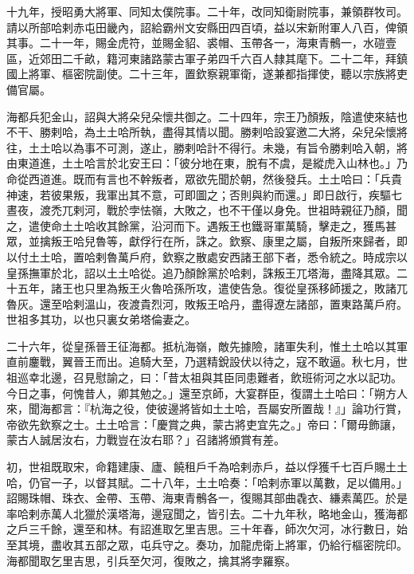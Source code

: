 \begin{pinyinscope}
 十九年，授昭勇大將軍、同知太僕院事。二十年，改同知衛尉院事，兼領群牧司。請以所部哈剌赤屯田畿內，詔給霸州文安縣田四百頃，益以宋新附軍人八百，俾領其事。二十一年，賜金虎符，並賜金貂、裘帽、玉帶各一，海東青鶻一，水磑壹區，近郊田二千畝，籍河東諸路蒙古軍子弟四千六百人隸其麾下。二十二年，拜鎮國上將軍、樞密院副使。二十三年，置欽察親軍衛，遂兼都指揮使，聽以宗族將吏備官屬。



 海都兵犯金山，詔與大將朵兒朵懷共御之。二十四年，宗王乃顏叛，陰遣使來結也不干、勝剌哈，為土土哈所執，盡得其情以聞。勝剌哈設宴邀二大將，朵兒朵懷將往，土土哈以為事不可測，遂止，勝剌哈計不得行。未幾，有旨令勝剌哈入朝，將由東道進，土土哈言於北安王曰：「彼分地在東，脫有不虞，是縱虎入山林也。」乃命從西道進。既而有言也不幹叛者，眾欲先聞於朝，然後發兵。土土哈曰：「兵貴神速，若彼果叛，我軍出其不意，可即圖之；否則與約而還。」即日啟行，疾驅七晝夜，渡禿兀剌河，戰於孛怯嶺，大敗之，也不干僅以身免。世祖時親征乃顏，聞之，遣使命土土哈收其餘黨，沿河而下。遇叛王也鐵哥軍萬騎，擊走之，獲馬甚眾，並擒叛王哈兒魯等，獻俘行在所，誅之。欽察、康里之屬，自叛所來歸者，即以付土土哈，置哈剌魯萬戶府，欽察之散處安西諸王部下者，悉令統之。時成宗以皇孫撫軍於北，詔以土土哈從。追乃顏餘黨於哈剌，誅叛王兀塔海，盡降其眾。二十五年，諸王也只里為叛王火魯哈孫所攻，遣使告急。復從皇孫移師援之，敗諸兀魯灰。還至哈剌溫山，夜渡貴烈河，敗叛王哈丹，盡得遼左諸部，置東路萬戶府。世祖多其功，以也只裏女弟塔倫妻之。



 二十六年，從皇孫晉王征海都。抵杭海嶺，敵先據險，諸軍失利，惟土土哈以其軍直前鏖戰，翼晉王而出。追騎大至，乃選精銳設伏以待之，寇不敢逼。秋七月，世祖巡幸北邊，召見慰諭之，曰：「昔太祖與其臣同患難者，飲班術河之水以記功。今日之事，何愧昔人，卿其勉之。」還至京師，大宴群臣，復謂土土哈曰：「朔方人來，聞海都言：『杭海之役，使彼邊將皆如土土哈，吾屬安所置哉！』」論功行賞，帝欲先欽察之士。土土哈言：「慶賞之典，蒙古將吏宜先之。」帝曰：「爾毋飾讓，蒙古人誠居汝右，力戰豈在汝右耶？」召諸將頒賞有差。



 初，世祖既取宋，命籍建康、廬、饒租戶千為哈剌赤戶，益以俘獲千七百戶賜土土哈，仍官一子，以督其賦。二十八年，土土哈奏：「哈剌赤軍以萬數，足以備用。」詔賜珠帽、珠衣、金帶、玉帶、海東青鶻各一，復賜其部曲毳衣、縑素萬匹。於是率哈剌赤萬人北獵於漢塔海，邊寇聞之，皆引去。二十九年秋，略地金山，獲海都之戶三千餘，還至和林。有詔進取乞里吉思。三十年春，師次欠河，冰行數日，始至其境，盡收其五部之眾，屯兵守之。奏功，加龍虎衛上將軍，仍給行樞密院印。海都聞取乞里吉思，引兵至欠河，復敗之，擒其將孛羅察。




\end{pinyinscope}
